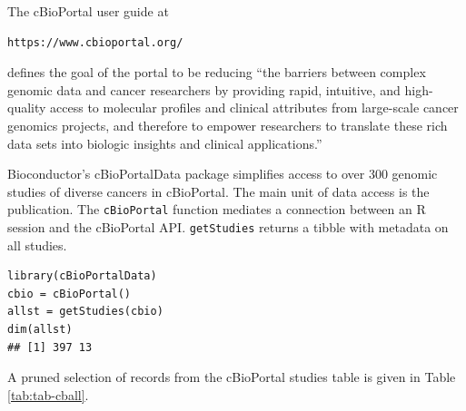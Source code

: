 \documentclass[graybox]{svmult}
\begin{document}
The cBioPortal user guide
at 
\begin{verbatim}
https://www.cbioportal.org/
\end{verbatim}
defines the goal of the portal to be reducing ``the barriers between complex
genomic data and cancer researchers by providing rapid, intuitive, and high-quality
access to molecular profiles and clinical attributes from large-scale cancer genomics projects, and
therefore to empower researchers to translate these rich data sets into biologic insights and clinical applications.''

Bioconductor's cBioPortalData package simplifies access to over 300 genomic studies of
diverse cancers in cBioPortal. The main unit of data access is the publication. The
\texttt{cBioPortal} function mediates a connection between an R session and the
cBioPortal API. \texttt{getStudies} returns a tibble with metadata on
all studies.

\begin{shaded}
\begin{verbatim}
library(cBioPortalData)
cbio = cBioPortal()
allst = getStudies(cbio)
dim(allst)
## [1] 397 13
\end{verbatim}
\end{shaded}

A pruned selection of records from the cBioPortal
studies table is given in Table \ref{tab:tab-cball}.
\end{document}
